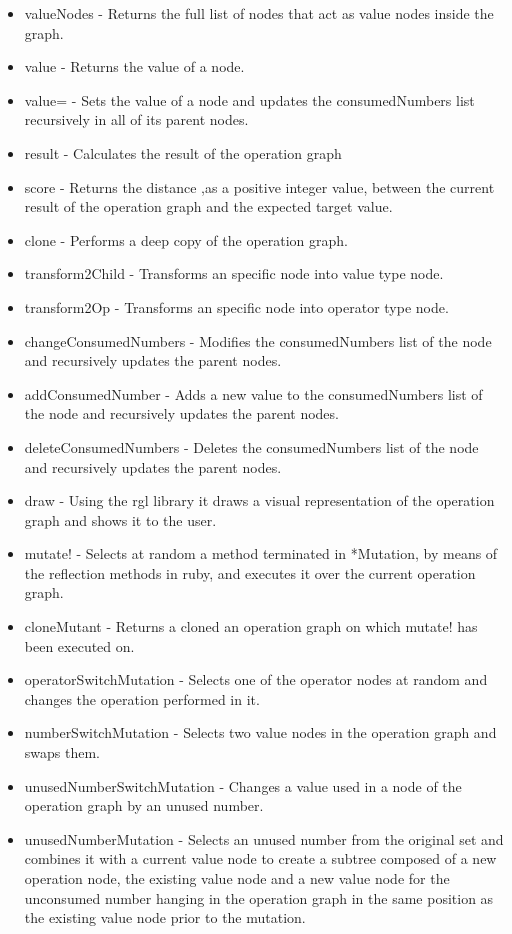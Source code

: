 \documentclass[a4paper,10pt,titlepage]{article}
\begin{document}
\begin{description}
\begin{itemize}
		\item valueNodes - Returns the full list of nodes that act as value nodes inside the graph.
		\item value - Returns the value of a node.
		\item value= - Sets the value of a node and updates the consumedNumbers list recursively in all of its parent nodes.
		\item result - Calculates the result of the operation graph
		\item score - Returns the distance ,as a positive integer value, between the current result of the operation graph and the expected target value.
		\item clone - Performs a deep copy of the operation graph.
		\item transform2Child - Transforms an specific node into  value type node.
		\item transform2Op - Transforms an specific node into operator type node.
		\item changeConsumedNumbers - Modifies the consumedNumbers list of the node and recursively updates the parent nodes.
		\item addConsumedNumber - Adds a new value to the consumedNumbers list of the node and recursively updates the parent nodes.
		\item deleteConsumedNumbers - Deletes the consumedNumbers list of the node and recursively updates the parent nodes.
		\item draw - Using the rgl library it draws a visual representation of the operation graph and shows it to the user.
		\item mutate! - Selects at random a method terminated in *Mutation, by means of the reflection methods in ruby, and executes it over the current operation graph.
		\item cloneMutant - Returns a cloned an operation graph on which mutate! has been executed on. 
		\item operatorSwitchMutation - Selects one of the operator nodes at random and changes the operation performed in it. 
		\item numberSwitchMutation - Selects two value nodes in the operation graph and swaps them. 
		\item unusedNumberSwitchMutation - Changes a value used in a node of the operation graph by an unused number. 
		\item unusedNumberMutation - Selects an unused number from the original set and combines it with a current value node to create a subtree composed of a new operation node, the existing value node and a new value node for the unconsumed number hanging in the operation graph in the same position as the existing value node prior to the mutation. 

\end{itemize}
\end{description}
\end{document}
